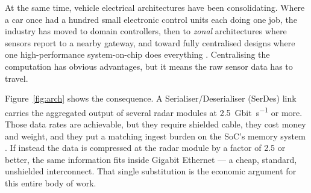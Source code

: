 At the same time, vehicle electrical architectures have been consolidating.
Where a car once had a hundred small electronic control units each doing one
job, the industry has moved to domain controllers, then to \emph{zonal}
architectures where sensors report to a nearby gateway, and toward fully
centralised designs where one high-performance system-on-chip does everything
\cite{bandur2021,liu2022,barabas2024}. Centralising the computation has obvious
advantages, but it means the raw sensor data has to travel.

Figure~\ref{fig:arch} shows the consequence. A Serialiser/Deserialiser (SerDes)
link \cite{ti_serdes,gmsl} carries the aggregated output of several radar
modules at \SI{2.5}{Gbit\per\second} or more. Those data rates are achievable,
but they require shielded cable, they cost money and weight, and they put a
matching ingest burden on the SoC's memory system \cite{matheus2021}. If
instead the data is compressed at the radar module by a factor of \num{2.5} or
better, the same information fits inside Gigabit Ethernet
\cite{ieee8023bp} --- a cheap, standard, unshielded interconnect. That single
substitution is the economic argument for this entire body of work.

